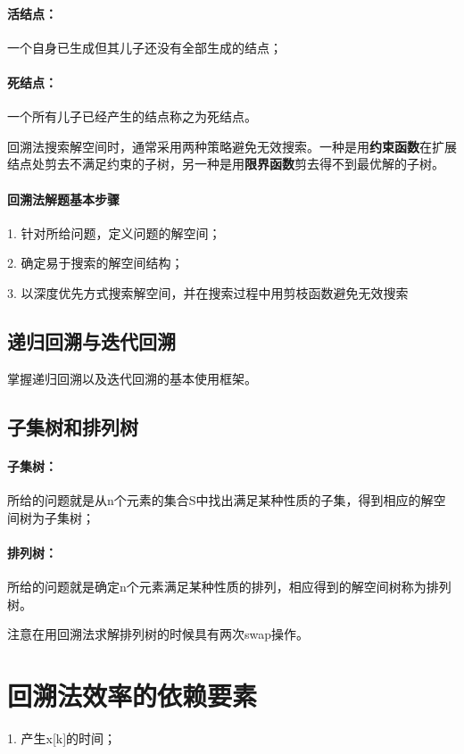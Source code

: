 \documentclass[UTF8]{ctexart}
\begin{document}
    \paragraph{活结点：} 一个自身已生成但其儿子还没有全部生成的结点；

    \paragraph{死结点：} 一个所有儿子已经产生的结点称之为死结点。

    回溯法搜索解空间时，通常采用两种策略避免无效搜索。一种是用\textbf{约束函数}在扩展结点处剪去不满足约束的子树，另一种是用\textbf{限界函数}剪去得不到最优解的子树。

    \paragraph{回溯法解题基本步骤}

    1. 针对所给问题，定义问题的解空间；

    2. 确定易于搜索的解空间结构；

    3. 以深度优先方式搜索解空间，并在搜索过程中用剪枝函数避免无效搜索

    \subsection{递归回溯与迭代回溯}
    掌握递归回溯以及迭代回溯的基本使用框架。

    \subsection{子集树和排列树}
    \paragraph{子集树：} 所给的问题就是从n个元素的集合S中找出满足某种性质的子集，得到相应的解空间树为子集树；

    \paragraph{排列树：} 所给的问题就是确定n个元素满足某种性质的排列，相应得到的解空间树称为排列树。

    注意在用回溯法求解排列树的时候具有两次swap操作。

    \section{回溯法效率的依赖要素}
    1. 产生x[k]的时间；
\end{document}
